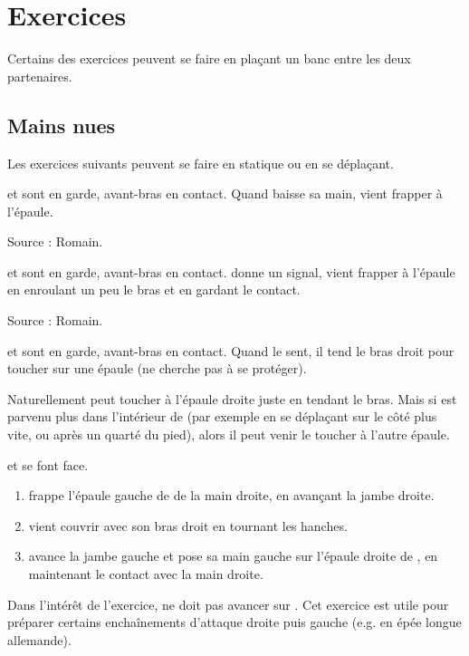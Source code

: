 \section{Exercices}


Certains des exercices peuvent se faire en plaçant un banc entre les deux partenaires.


\subsection{Mains nues}


Les exercices suivants peuvent se faire en statique ou en se déplaçant.


\begin{exercice}
\label{struct:ex:contact:frappe-signal}

\A et \D sont en garde, avant-bras en contact.
Quand \A baisse sa main, \D vient frapper à l'épaule.

Source : Romain.

\end{exercice}


\begin{exercice}

\A et \D sont en garde, avant-bras en contact.
\A donne un signal, \D vient frapper à l'épaule en enroulant un peu le bras et en gardant le contact.

Source : Romain.

\end{exercice}


\begin{exercice}
\label{struct:ex:contact:frappe-épaules}

\A et \D sont en garde, avant-bras en contact.
Quand \A le sent, il tend le bras droit pour toucher \D sur une épaule (\D ne cherche pas à se protéger).

Naturellement \A peut toucher \D à l'épaule droite juste en tendant le bras.
Mais si \A est parvenu plus dans l'intérieur de \D (par exemple en se déplaçant sur le côté plus vite, ou après un quarté du pied), alors il peut venir le toucher à l'autre épaule.

\end{exercice}


\begin{exercice}
\label{struct:ex:frappe-gauche-droite}

\A et \D se font face.

\begin{enumerate}
	\item \A frappe l'épaule gauche de \D de la main droite, en avançant la jambe droite.
	\item \D vient couvrir avec son bras droit en tournant les hanches.
	\item \A avance la jambe gauche et pose sa main gauche sur l'épaule droite de \D, en maintenant le contact avec la main droite.
\end{enumerate}

Dans l'intérêt de l'exercice, \D ne doit pas avancer sur \A.
Cet exercice est utile pour préparer certains enchaînements d'attaque droite puis gauche (e.g.
en épée longue allemande).

\end{exercice}


